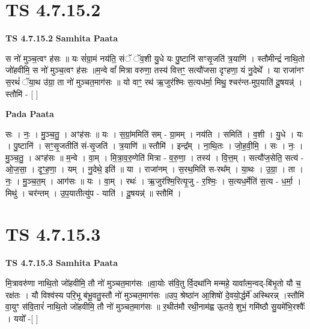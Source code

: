 \documentclass[17pt]{extarticle}
\begin{document}

\section{ TS 4.7.15.2 }

\textbf{TS 4.7.15.2 } \newline
\textbf{Samhita Paata} \newline

स नो॑ मुञ्च॒त्वꣳ ह॑सः ॥ यः सं॑ग्रा॒मं नय॑ति॒ संॅ ॅव॒शी यु॒धे यः पु॒ष्टानि॑ सꣳसृ॒जति॑ त्र॒याणि॑ । स्तौमीन्द्रं॑ नाथि॒तो जो॑हवीमि॒ स नो॑ मुञ्च॒त्वꣳ ह॑सः ॥म॒न्वे वां᳚ मित्रा वरुणा॒ तस्य॑ वित्तꣳ॒॒ सत्यौ॑जसा दृꣳहणा॒ यं नु॒देथे᳚ । या राजा॑नꣳ स॒रथं॑ ॅया॒थ उ॑ग्रा॒ ता नो॑ मुञ्चत॒माग॑सः ॥ यो वाꣳ॒॒ रथ॑ ऋ॒जुर॑श्मिः स॒त्यध॑र्मा॒ मिथु॒ श्चर॑न्त-मुप॒याति॑ दू॒षयन्न्॑ । स्तौमि॑ - [  ] \newline

\textbf{Pada Paata} \newline

सः । नः॒ । मु॒ञ्च॒तु॒ । अꣳह॑सः ॥ यः । स॒ग्रां॒ममिति॑ सम् - ग्रा॒मम् । नय॑ति । समिति॑ । व॒शी । यु॒धे । यः । पु॒ष्टानि॑ । सꣳ॒॒सृ॒जतीति॑ सं-सृ॒जति॑ । त्र॒याणि॑ ॥ स्तौमि॑ । इन्द्र᳚म् । ना॒थि॒तः । जो॒ह॒वी॒मि॒ । सः । नः॒ । मु॒ञ्च॒तु॒ । अꣳह॑सः ॥ म॒न्वे । वा॒म् । मि॒त्रा॒व॒रु॒णेति॑ मित्रा - व॒रु॒णा॒ । तस्य॑ । वि॒त्त॒म् । सत्यौ॑ज॒सेति॒ सत्य॑ - ओ॒ज॒सा॒ । दृꣳ॒॒ह॒णा॒ । यम् । नु॒देथे॒ इति॑ ॥ या । राजा॑नम् । स॒रथ॒मिति॑ स-रथ᳚म् । या॒थः । उ॒ग्रा॒ । ता । नः॒ । मु॒ञ्च॒त॒म् । आग॑सः ॥ यः । वा॒म् । रथः॑ । ऋ॒जुर॑श्मि॒रित्यृ॒जु - र॒श्मिः॒ । स॒त्यध॒र्मेति॑ स॒त्य - ध॒र्मा॒ । मिथु॑ । चर॑न्तम् । उ॒प॒यातीत्यु॑प - याति॑ । दू॒षयन्न्॑ ॥ स्तौमि॑ ।  \newline





\section{ TS 4.7.15.3 }

\textbf{TS 4.7.15.3 } \newline
\textbf{Samhita Paata} \newline

मि॒त्रावरु॑णा नाथि॒तो जो॑हवीमि॒ तौ नो॑ मुञ्चत॒माग॑सः ॥वा॒योः स॑वि॒तु र्वि॒दथा॑नि मन्महे॒ यावा᳚त्म॒न्वद्-बि॑भृ॒तो यौ च॒ रक्ष॑तः । यौ विश्व॑स्य परि॒भू ब॑भू॒वतु॒स्तौ नो॑ मुञ्चत॒माग॑सः ॥उप॒ श्रेष्ठा॑न आ॒शिषो॑ दे॒वयो॒र्द्धर्मे॑ अस्थिरन्न् ।स्तौमि॑ वा॒युꣳ स॑वि॒तारं॑ नाथि॒तो जो॑हवीमि॒ तौ नो॑ मुञ्चत॒माग॑सः ॥ र॒थीत॑मौ रथी॒नाम॑ह्व ऊ॒तये॒ शुभं॒ गमि॑ष्ठौ सु॒यमे॑भि॒रश्वैः᳚ । ययो᳚ -[  ] \newline
\end{document}
